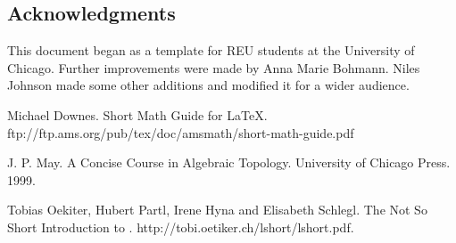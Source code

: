 \documentclass[11pt,oneside,draft]{amsart}
\numberwithin{equation}{section} %
\numberwithin{figure}{section} %
\theoremstyle{plain} %
\theoremstyle{definition} %
\theoremstyle{remark} %
\begin{document}
\begin{center}
\end{center}


\subsection*{Acknowledgments}  

This document began as a template for REU students at the University
of Chicago.  Further improvements were made by Anna Marie Bohmann.
Niles Johnson made some other additions and modified it for a wider
audience.

\begin{thebibliography}{9}

Michael Downes.
Short Math Guide for \LaTeX.
ftp://ftp.ams.org/pub/tex/doc/amsmath/short-math-guide.pdf

J. P. May.
A Concise Course in Algebraic Topology.
University of Chicago Press. 1999. 

Tobias Oekiter, Hubert Partl, Irene Hyna and Elisabeth Schlegl.
The Not So Short Introduction to \LaTeXe.
http://tobi.oetiker.ch/lshort/lshort.pdf.

\end{thebibliography}
\end{document}
